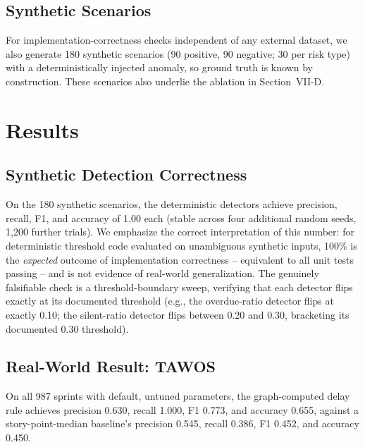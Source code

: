 \documentclass[conference]{IEEEtran}
\begin{document}
\subsection{Synthetic Scenarios}

For implementation-correctness checks independent of any external dataset, we also
generate 180 synthetic scenarios (90 positive, 90 negative; 30 per risk type) with a
deterministically injected anomaly, so ground truth is known by construction. These
scenarios also underlie the ablation in Section~VII-D.

\section{Results}

\subsection{Synthetic Detection Correctness}

On the 180 synthetic scenarios, the deterministic detectors achieve precision,
recall, F1, and accuracy of 1.00 each (stable across four additional random seeds,
1{,}200 further trials). We emphasize the correct interpretation of this number: for
deterministic threshold code evaluated on unambiguous synthetic inputs, 100\% is the
\emph{expected} outcome of implementation correctness -- equivalent to all unit tests
passing -- and is not evidence of real-world generalization. The genuinely
falsifiable check is a threshold-boundary sweep, verifying that each detector flips
exactly at its documented threshold (e.g., the overdue-ratio detector flips at
exactly 0.10; the silent-ratio detector flips between 0.20 and 0.30, bracketing its
documented 0.30 threshold).

\subsection{Real-World Result: TAWOS}

On all 987 sprints with default, untuned parameters, the graph-computed delay rule
achieves precision 0.630, recall 1.000, F1 0.773, and accuracy 0.655, against a
story-point-median baseline's precision 0.545, recall 0.386, F1 0.452, and accuracy
0.450.
\end{document}

